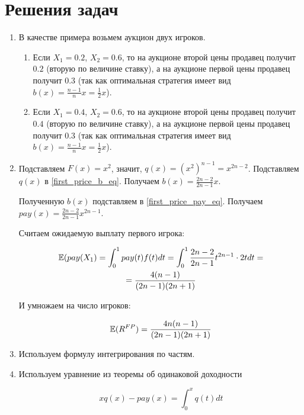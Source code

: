 \section{Решения задач}

\begin{enumerate}
\item В качестве примера возьмем аукцион двух игроков.

\begin{enumerate}
\item Если $ X_{1}=0.2 $, $ X_{2}=0.6 $, то на аукционе второй цены продавец получит $ 0.2 $ (вторую по величине ставку), а на аукционе первой цены продавец получит $ 0.3 $ (так как оптимальная стратегия имеет вид $ b(x)=\frac{n-1}{n}x=\frac{1}{2}x $).

\item Если $ X_{1}=0.4 $, $ X_{2}=0.6 $, то на аукционе второй цены продавец получит $ 0.4 $ (вторую по величине ставку), а на аукционе первой цены продавец получит $ 0.3 $ (так как оптимальная стратегия имеет вид $ b(x)=\frac{n-1}{n}x=\frac{1}{2}x $).
\end{enumerate}

\item Подставляем $ F(x)=x^{2} $, значит, $ q(x)=(x^{2})^{n-1}=x^{2n-2} $. Подставляем $ q(x) $ в \ref{first_price_b_eq}. Получаем $ b(x)=\frac{2n-2}{2n-1}x $.

Полученную $ b(x) $ подставляем в \ref{first_price_pay_eq}. Получаем $ pay(x)=\frac{2n-2}{2n-1}x^{2n-1} $.

Считаем ожидаемую выплату первого игрока:

\begin{multline}
\mathbb{E}(pay(X_{1})=\int_{0}^{1}pay(t)f(t)dt=\int_{0}^{1}\frac{2n-2}{2n-1}t^{2n-1}\cdot 2tdt=\\
=\frac{4(n-1)}{(2n-1)(2n+1)}
\end{multline}

И умножаем на число игроков:

\begin{equation}
\mathbb{E}(R^{FP})=\frac{4n(n-1)}{(2n-1)(2n+1)}
\end{equation}

\item Используем формулу интегрирования по частям.


\item Используем уравнение из теоремы об одинаковой доходности

\begin{equation}
xq(x)-pay(x)=\int_{0}^{x}q(t)dt
\end{equation}


\end{enumerate}
